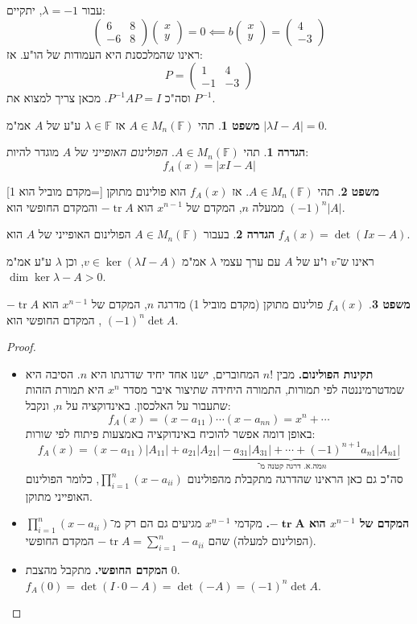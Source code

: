\documentclass[a4paper]{article}
\DeclareMathOperator{\tr}      {tr}
\newcommand\F         {\mathbb{F}}
\newcommand\pms[1]    {\begin{pmatrix}
		#1
\end{pmatrix}}
\renewcommand\lg      {\lambda}
\newcommand\op    {^{-1}}
\theoremstyle{definition}
\newtheorem{Theorem}{\color{myblue}משפט}
\newtheorem{Definition}{\color{mygreen}הגדרה}
\newcommand\theo  [1] {\begin{Theorem}#1\end{Theorem}}
\newcommand\defi  [1] {\begin{Definition}#1\end{Definition}}
\begin{document}
	עבור $\lg = -1$, יתקיים: 
	\[ \pms{6 & 8 \\ -6 & 8}\pms{x \\ y} = 0 \impliedby b\pms{x \\ y} = \pms{4 \\ -3} \]
	ראינו שהמלכסנת היא העמודות של הו"ע. אז: 
	\[ P = \pms{1 & 4 \\ -1 & -3} \]
	וסה"כ $P\op A P = I$. מכאן צריך למצוא את $P\op$. 
	
	\theo{תהי $A \in M_n(\F)$ אז $\lg \in \F$ ע"ע של $A$ אמ"מ $|\lg I - A| = 0$. }
	
	\defi{תהי $A \in M_n(\F)$. \textit{הפולינום האופייני} של $A$ מוגדר להיות: 
		\[ f_A(x) = |xI - A| \]}
	
	\theo{תהי $A \in M_n(\F)$. אז $f_A(x)$ הוא פולינום מתוקן [=מקדם מוביל הוא 1] ממעלה $n$, המקדם של $x^{n - 1}$ הוא $- \tr A$ והמקדם החופשי הוא $(-1)^{n}|A|$. }
	
	\defi{בעבור $A \in M_n(\F)$ הפולינום האופייני של $A$ הוא $f_A(x) = \det(Ix - A)$. }
	
	ראינו ש־$v$ ו"ע של $A$ עם ערך עצמי $\lg$ אמ"מ $v \in \ker(\lg I - A)$, וכן $\lg$ ע"ע אמ"מ $\dim \ker \lg - A > 0$. 
	
	\theo{$f_A(x)$ פולינום מתוקן (מקדם מוביל 1) מדרגה $n$, המקדם של $x^{n - 1}$ הוא $-\tr A$, המקדם החופשי הוא $(-1)^{n}\det A$. }
	
	\begin{proof}\,
		\begin{itemize}
			\item\textbf{ תקינות הפולינום. }מבין $n!$ המחוברים, ישנו אחד יחיד שדרגתו היא $n$. הסיבה היא שמדטרמיננטה לפי תמורות, התמורה היחידה שתיצור איבר מסדר $x^n$ היא תמורת הזהות שתעבור על האלכסון. באינדוקציה על $n$, ונקבל: 
			\[ f_A(x) = (x - a_{11}) \cdots (x - a_{nn}) = x^{n} + \cdots \]
			באופן דומה אפשר להוכיח באינדוקציה באמצעות פיתוח לפי שורות: 
			\[ f_A(x) = (x - a_{11})|A_11| + \underbrace{a_{21}|A_21| - a_{31}|A_31| + \cdots + (-1)^{n + 1}a_{n1}|A_{n1}|}_{\,\!\text{מה.א. דרגה קטנה מ־$n$}} \]
			סה"כ גם כאן הראינו שהדרגה מתקבלת מהפולינום $\prod^{n}_{i = 1}(x - a_{ii})$, כלומר הפולינום האופייני מתוקן. 
			
			\item\textbf{המקדם של $x^{n - 1}$ הוא $\bm{-\tr A}$. } מקדמי $x^{n - 1}$ מגיעים גם הם רק מ־$\prod^{n}_{i = 1}(x - a_{ii})$ (הפולינום למעלה) שהם $-\tr A = \sum_{i = 1}^{n}-a_{ii}$ המקדם החופשי. 
			\item\textbf{המקדם החופשי. }מתקבל מהצבת $0$. $f_A(0) = \det(I \cdot 0 - A) = \det(-A) = (-1)^{n}\det A$. 
		\end{itemize}
	\end{proof}
	
\end{document}
